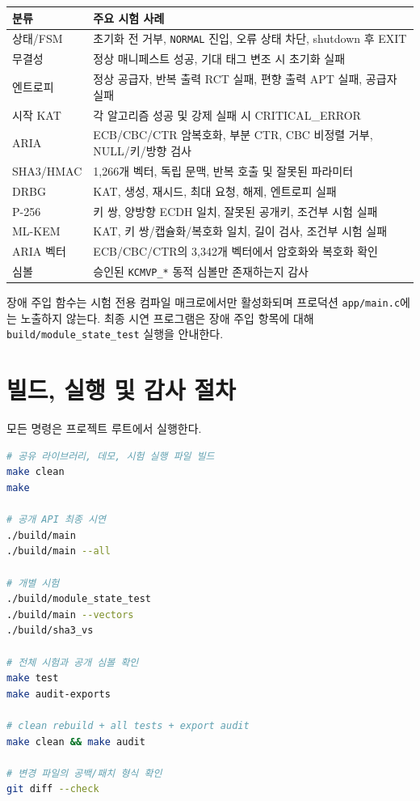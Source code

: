 \documentclass[11pt,a4paper]{article}
\begin{document}
\begin{longtable}{p{}p{}}
\toprule
분류 & 주요 시험 사례 \\
\midrule
\endhead
상태/FSM & 초기화 전 거부, \texttt{NORMAL} 진입, 오류 상태 차단, shutdown 후 EXIT \\
무결성 & 정상 매니페스트 성공, 기대 태그 변조 시 초기화 실패 \\
엔트로피 & 정상 공급자, 반복 출력 RCT 실패, 편향 출력 APT 실패, 공급자 실패 \\
시작 KAT & 각 알고리즘 성공 및 강제 실패 시 CRITICAL\_ERROR \\
ARIA & ECB/CBC/CTR 암복호화, 부분 CTR, CBC 비정렬 거부, NULL/키/방향 검사 \\
SHA3/HMAC & 1,266개 벡터, 독립 문맥, 반복 호출 및 잘못된 파라미터 \\
DRBG & KAT, 생성, 재시드, 최대 요청, 해제, 엔트로피 실패 \\
P-256 & 키 쌍, 양방향 ECDH 일치, 잘못된 공개키, 조건부 시험 실패 \\
ML-KEM & KAT, 키 쌍/캡슐화/복호화 일치, 길이 검사, 조건부 시험 실패 \\
ARIA 벡터 & ECB/CBC/CTR의 3,342개 벡터에서 암호화와 복호화 확인 \\
심볼 & 승인된 \texttt{KCMVP\_*} 동적 심볼만 존재하는지 감사 \\
\bottomrule
\end{longtable}

장애 주입 함수는 시험 전용 컴파일 매크로에서만 활성화되며 프로덕션
\texttt{app/main.c}에는 노출하지 않는다. 최종 시연 프로그램은 장애 주입
항목에 대해 \texttt{build/module\_state\_test} 실행을 안내한다.

\section{빌드, 실행 및 감사 절차}

모든 명령은 프로젝트 루트에서 실행한다.

\begin{lstlisting}[language=bash]
# 공유 라이브러리, 데모, 시험 실행 파일 빌드
make clean
make

# 공개 API 최종 시연
./build/main
./build/main --all

# 개별 시험
./build/module_state_test
./build/main --vectors
./build/sha3_vs

# 전체 시험과 공개 심볼 확인
make test
make audit-exports

# clean rebuild + all tests + export audit
make clean && make audit

# 변경 파일의 공백/패치 형식 확인
git diff --check
\end{lstlisting}
\end{document}
